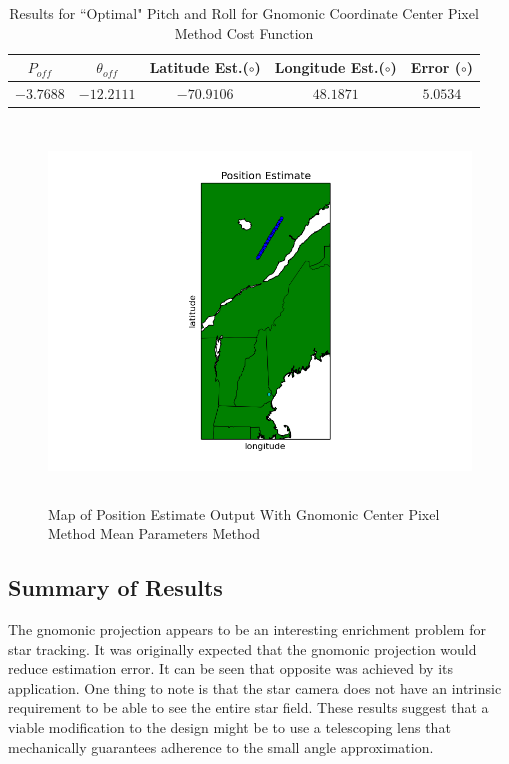\documentclass[12pt,a4paper]{book}
\begin{document}
\begin{table}[ht!]
\centering
\begin{tabular}{ |c|c|c|c|c| } 
 \hline
 $P_{off}$ & $\theta_{off}$ & Latitude Est.($\circ$) & Longitude Est.($\circ$)&Error ($\circ$) \\ 
 \hline
 $-3.7688$ & $-12.2111$ &$-70.9106$ & $48.1871$ &$5.0534$   \\ 
 \hline
\end{tabular}
\caption{Results for ``Optimal" Pitch and Roll for Gnomonic Coordinate Center Pixel Method Cost Function}
\label{t:gnomOptimized}
\end{table}

\begin{figure}[!ht]
\centering
\includegraphics[height=10cm]{gnomOptimal_map.png}
\caption{Map of Position Estimate Output With Gnomonic Center Pixel Method Mean Parameters Method}\label{f:gnomOptimal_map}
\end{figure}
\FloatBarrier
\subsection{Summary of Results}
The gnomonic projection appears to be an interesting enrichment problem for star tracking.  It was originally expected that the gnomonic projection would reduce estimation error.  It can be seen that opposite was achieved by its application.  One thing to note is that the star camera does not have an intrinsic requirement to be able to see the entire star field.  These results suggest that a viable modification to the design might be to use a telescoping lens that mechanically guarantees adherence to the small angle approximation.  
\end{document}

